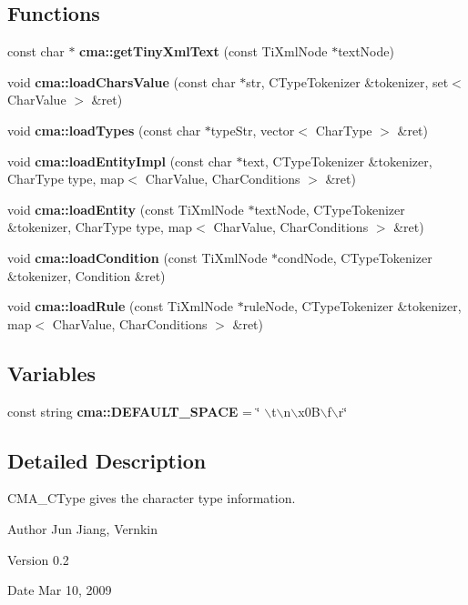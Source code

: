 \subsection*{Functions}
\begin{DoxyCompactItemize}
\item 
const char $\ast$ {\bfseries cma::getTinyXmlText} (const TiXmlNode $\ast$textNode)\label{namespacecma_a9e262f7d98782e77249652852109952a}

\item 
void {\bfseries cma::loadCharsValue} (const char $\ast$str, CTypeTokenizer \&tokenizer, set$<$ CharValue $>$ \&ret)\label{namespacecma_aab115ac8f5f6e8aa470f025bf114773b}

\item 
void {\bf cma::loadTypes} (const char $\ast$typeStr, vector$<$ CharType $>$ \&ret)
\item 
void {\bfseries cma::loadEntityImpl} (const char $\ast$text, CTypeTokenizer \&tokenizer, CharType type, map$<$ CharValue, CharConditions $>$ \&ret)\label{namespacecma_a76b89689131f8c4b4b6574ad684e910b}

\item 
void {\bfseries cma::loadEntity} (const TiXmlNode $\ast$textNode, CTypeTokenizer \&tokenizer, CharType type, map$<$ CharValue, CharConditions $>$ \&ret)\label{namespacecma_aa633d17ab2db100f6da72cf5736f8d45}

\item 
void {\bfseries cma::loadCondition} (const TiXmlNode $\ast$condNode, CTypeTokenizer \&tokenizer, Condition \&ret)\label{namespacecma_afc9de2d3ab1659aa8e628b95a490270e}

\item 
void {\bfseries cma::loadRule} (const TiXmlNode $\ast$ruleNode, CTypeTokenizer \&tokenizer, map$<$ CharValue, CharConditions $>$ \&ret)\label{namespacecma_afa2a411436584a8e37139dffd9f44c1a}

\end{DoxyCompactItemize}
\subsection*{Variables}
\begin{DoxyCompactItemize}
\item 
const string {\bfseries cma::DEFAULT\_\-SPACE} = \char`\"{} $\backslash$t$\backslash$n$\backslash$x0B$\backslash$f$\backslash$r\char`\"{}\label{namespacecma_ac59a7f8f000563d36ce3c8351df07f89}

\end{DoxyCompactItemize}


\subsection{Detailed Description}
CMA\_\-CType gives the character type information. \begin{DoxyAuthor}{Author}
Jun Jiang, Vernkin 
\end{DoxyAuthor}
\begin{DoxyVersion}{Version}
0.2 
\end{DoxyVersion}
\begin{DoxyDate}{Date}
Mar 10, 2009 
\end{DoxyDate}
